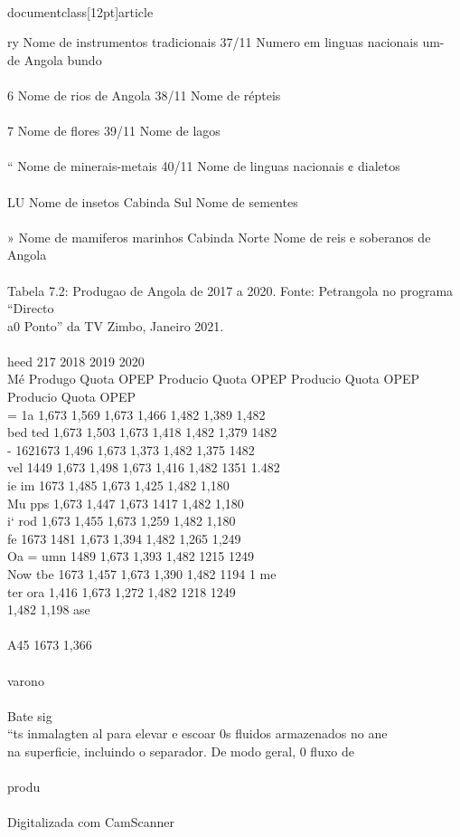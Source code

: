 \\documentclass[12pt]{article}
\begin{document}
ry Nome de instrumentos tradicionais 37/11 Numero em linguas nacionais um-\\
de Angola bundo\\
\\
6 Nome de rios de Angola 38/11 Nome de répteis\\
\\
7 Nome de flores 39/11 Nome de lagos\\
\\
“ Nome de minerais-metais 40/11 Nome de linguas nacionais ¢ dialetos\\
\\
LU Nome de insetos Cabinda Sul Nome de sementes\\
\\
» Nome de mamiferos marinhos Cabinda Norte Nome de reis e soberanos de Angola\\
\\
Tabela 7.2: Produgao de Angola de 2017 a 2020. Fonte: Petrangola no programa “Directo\\
a0 Ponto” da TV Zimbo, Janeiro 2021.\\
\\
heed 217 2018 2019 2020\\
Mé Produgo Quota OPEP Producio Quota OPEP Producio Quota OPEP Producio Quota OPEP\\
= 1a 1,673 1,569 1,673 1,466 1,482 1,389 1,482\\
bed ted 1,673 1,503 1,673 1,418 1,482 1,379 1482\\
- 1621673 1,496 1,673 1,373 1,482 1,375 1482\\
vel 1449 1,673 1,498 1,673 1,416 1,482 1351 1.482\\
ie im 1673 1,485 1,673 1,425 1,482 1,180\\
Mu pps 1,673 1,447 1,673 1417 1,482 1,180\\
i‘ rod 1,673 1,455 1,673 1,259 1,482 1,180\\
fe 1673 1481 1,673 1,394 1,482 1,265 1,249\\
Oa = umn 1489 1,673 1,393 1,482 1215 1249\\
Now tbe 1673 1,457 1,673 1,390 1,482 1194 1 me\\
ter ora 1,416 1,673 1,272 1,482 1218 1249\\
1,482 1,198 ase\\
\\
A45 1673 1,366\\
\\
varono\\
\\
Bate sig\\
“ts inmalagten al para elevar e escoar 0s fluidos armazenados no ane\\
na superficie, incluindo o separador. De modo geral, 0 fluxo de\\
\\
produ\\
\\
Digitalizada com CamScanner\\
\end{document}
